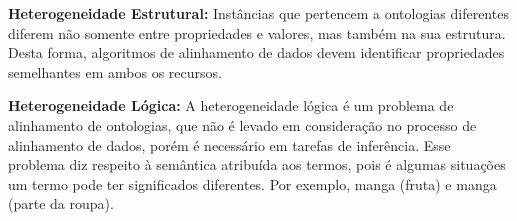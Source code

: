 \textbf{Heterogeneidade Estrutural:}
Instâncias que pertencem a ontologias diferentes diferem não somente entre propriedades e valores, mas também na sua estrutura. Desta forma, algoritmos de alinhamento de dados devem identificar propriedades semelhantes em ambos os recursos.


\textbf{Heterogeneidade Lógica:}
% 
% 
%
%
A heterogeneidade lógica é um problema de alinhamento de ontologias, que não é levado em consideração no processo de alinhamento de dados, porém é necessário em tarefas de inferência. Esse problema diz respeito à semântica atribuída aos termos, pois é algumas situações um termo pode ter significados diferentes. Por exemplo, manga (fruta) e manga (parte da roupa).

